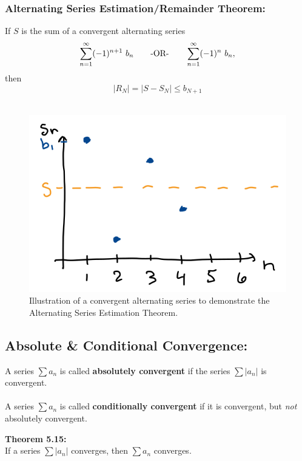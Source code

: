 \subsubsection*{Alternating Series Estimation/Remainder Theorem:}
If \(S\)  is the sum of a convergent alternating series
\[
\sum_{n=1}^\infty (-1)^{n+1}\ b_n  \qquad \text{-OR-} \qquad \sum_{n=1}^\infty (-1)^{n}\ b_n ,
\]
 then 
\[
|R_N| = |S - S_N| \leq b_{N+1}
\]
~\\
\begin{figure}[!h]
\centering
\includegraphics[width=.75\columnwidth]{Ch8s4-ASET.png}
\caption{Illustration of a convergent alternating series to demonstrate the Alternating Series Estimation Theorem.}
\end{figure}

\vspace*{.1in}

\subsection*{Absolute \& Conditional Convergence:}
A series \(\sum a_n\) is called \textbf{absolutely convergent} if the series \(\sum |a_n|\) is convergent.\\~\\

A series \(\sum a_n\) is called \textbf{conditionally convergent} if it is convergent, but \textit{not} absolutely convergent.


\textbf{Theorem 5.15:}\\
If a series \(\sum |a_n|\) converges, then \(\sum a_n\) converges.



